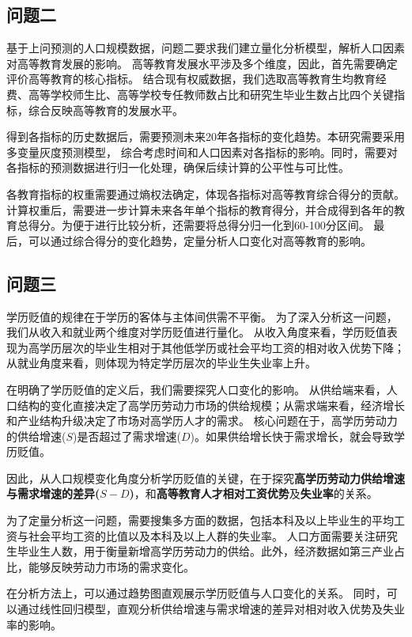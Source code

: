 \documentclass[withoutpreface,bwprint]{cumcmthesis} %
\newcommand{\upcite}[1]{\textsuperscript{\textsuperscript{\cite{#1}}}}
\begin{document}
\subsection{问题二}

基于上问预测的人口规模数据，问题二要求我们建立量化分析模型，解析人口因素对高等教育发展的影响。
高等教育发展水平涉及多个维度，因此，首先需要确定评价高等教育的核心指标。
结合现有权威数据，我们选取高等教育生均教育经费、高等学校师生比、高等学校专任教师数占比和研究生毕业生数占比四个关键指标，综合反映高等教育的发展水平。

得到各指标的历史数据后，需要预测未来20年各指标的变化趋势。本研究需要采用多变量灰度预测模型，
综合考虑时间和人口因素对各指标的影响。同时，需要对各指标的预测数据进行归一化处理，确保后续计算的公平性与可比性。

各教育指标的权重需要通过熵权法确定，体现各指标对高等教育综合得分的贡献。
计算权重后，需要进一步计算未来各年单个指标的教育得分，并合成得到各年的教育总得分。为便于进行比较分析，还需要将总得分归一化到60-100分区间。
最后，可以通过综合得分的变化趋势，定量分析人口变化对高等教育的影响。

\subsection{问题三}

学历贬值的规律在于学历的客体与主体间供需不平衡\upcite{学历贬值}。
为了深入分析这一问题，我们从收入和就业两个维度对学历贬值进行量化。
从收入角度来看，学历贬值表现为高学历层次的毕业生相对于其他低学历或社会平均工资的相对收入优势下降；
从就业角度来看，则体现为特定学历层次的毕业生失业率上升。

在明确了学历贬值的定义后，我们需要探究人口变化的影响。
从供给端来看，人口结构的变化直接决定了高学历劳动力市场的供给规模；从需求端来看，经济增长和产业结构升级决定了市场对高学历人才的需求。
核心问题在于，高学历劳动力的供给增速($S$)是否超过了需求增速($D$)。如果供给增长快于需求增长，就会导致学历贬值。

因此，从人口规模变化角度分析学历贬值的关键，在于探究\textbf{高学历劳动力供给增速与需求增速的差异($S-D$)}，和\textbf{高等教育人才相对工资优势}及\textbf{失业率}的关系。

为了定量分析这一问题，需要搜集多方面的数据，包括本科及以上毕业生的平均工资与社会平均工资的比值以及本科及以上人群的失业率。
人口方面需要关注研究生毕业生人数，用于衡量新增高学历劳动力的供给。此外，经济数据如第三产业占比，能够反映劳动力市场的需求变化。

在分析方法上，可以通过趋势图直观展示学历贬值与人口变化的关系。
同时，可以通过线性回归模型，直观分析供给增速与需求增速的差异对相对收入优势及失业率的影响。
\end{document}
